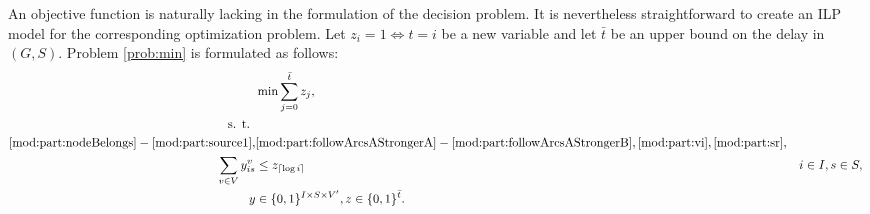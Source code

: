 An objective function is naturally lacking in the formulation of the decision problem.
It is nevertheless straightforward to create an ILP model for the corresponding optimization problem.
Let $z_i=1 \Leftrightarrow t=i$ be a new variable and let $\bar{t}$ be an upper bound on the delay in $(G,S)$.
Problem \ref{prob:min} is formulated as follows:
\begin{subequations}
\begin{align}
\notag &\min\sum\limits_{j=0}^{\bar{t}}z_j,\\
\notag \text{s. t. } \\
\notag \eqref{mod:part:nodeBelongs} - \eqref{mod:part:source1},& \eqref{mod:part:followArcsAStrongerA} - \eqref{mod:part:followArcsAStrongerB}, \eqref{mod:part:vi}, \eqref{mod:part:sr},\\
\notag\sum\limits_{v\in V}y^v_{is} & \leq z_{\lceil\log i\rceil} & i\in I,s\in S,\\
\notag\label{mod:part:optdim}y &\in \{0,1\}^{I\times S\times V'}, z \in \{0,1\}^{\bar{t}}.
\end{align}~
\end{subequations}

